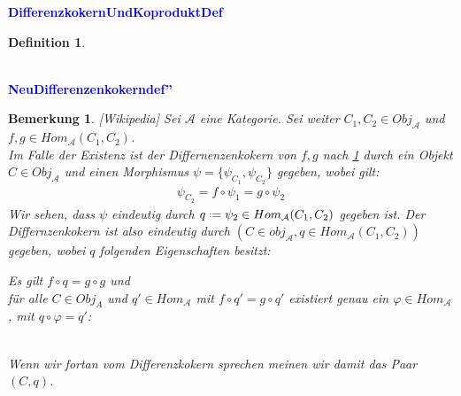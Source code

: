 \documentclass[10pt,a4paper]{report}
\newcounter{Aussage}[chapter]
\newtheorem{bem}[Aussage]{Bemerkung}
\newtheorem{definition}[Aussage]{Definition}
\newcommand*{\defeq}{\mathrel{\vcenter{\baselineskip0.5ex \lineskiplimit0pt
                     \hbox{\scriptsize.}\hbox{\scriptsize.}}}%
                     =}
\begin{document}
\textcolor{blue}{\textbf{DifferenzkokernUndKoproduktDef}}
\begin{definition}\label{DifferenzkokernUndKoproduktDef}
\end{definition}


\ \\
\textcolor{blue}{\textbf{NeuDifferenzenkokerndef''}}
\begin{bem}\label{NeuDifferenzenkokerndef''} \textit{[Wikipedia]}
Sei $\mathcal{A}$ eine Kategorie. Sei weiter $C_1,C_2 \in Obj_{\mathcal{A}}$ und $f,g \in Hom_{\mathcal{A}}(C_1,C_2)$.\\
Im Falle der Existenz ist der Differnenzenkokern von $f,g$ nach \cref{DifferenzkokernUndKoproduktDef} durch ein Objekt $C \in Obj_{\mathcal{A}}$ und einen Morphismus $\psi = \lbrace \psi_{C_1}, \psi_{C_2}\rbrace$ gegeben, wobei gilt:
\begin{gather*}
\psi_{C_2} = f \circ \psi_1 = g \circ \psi_2
\end{gather*}
Wir sehen, dass $\psi$ eindeutig durch $q \defeq \psi_2 \in Hom_{\mathcal{A}}(C_1,C_2)$ gegeben ist. Der Differnzenkokern ist also eindeutig durch $(C \in obj_\mathcal{A},q \in Hom_{\mathcal{A}}(C_1,C_2))$ gegeben, wobei $q$ folgenden Eigenschaften besitzt:
\begin{center}
Es gilt $f \circ q = g \circ g$ und\\
für alle $C \in Obj_{A}$ und $q' \in Hom_{\mathcal{A}}$ mit $f \circ q' = g \circ q'$ existiert genau ein $\varphi \in Hom_{\mathcal{A}}$, mit $q \circ \varphi = q'$:\\
\ \\
\end{center}
Wenn wir fortan vom Differenzkokern sprechen meinen wir damit das Paar $(C,q)$.
\end{bem}
\end{document}
